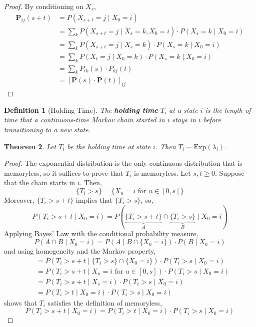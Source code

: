\documentclass{tufte-handout}
\newtheorem{thm}{Theorem}
\newtheorem{defn}[thm]{Definition}
\begin{document}
\begin{proof}
  By conditioning on $X_s$, 
  \begin{align*}
    \boldsymbol{P}_{i j}(s+t) &=P\left(X_{s+t}=j \mid X_{0}=i\right) \\
    &=\sum_{k} P\left(X_{s+t}=j \mid X_{s}=k, X_{0}=i\right) \cdot P\left(X_{s}=k \mid X_{0}=i\right) \\
    &=\sum_{k} P\left(X_{s+t}=j \mid X_{s}=k\right) \cdot P\left(X_{s}=k \mid X_{0}=i\right) \\
    &=\sum_{k} P\left(X_{t}=j \mid X_{0}=k\right) \cdot P\left(X_{s}=k \mid X_{0}=i\right) \\
    &=\sum_{k} P_{i k}(s) \cdot P_{k j}(t) \\
    &=[\mathbf{P}(s) \cdot \mathbf{P}(t)]_{i j}
    \end{align*}
\end{proof}

\begin{defn}[Holding Time]
  The \textbf{holding time} $T_i$ at a state $i$ is the length of time that a continuous-time Markov chain started in $i$ stays in $i$ before transitioning to a new state.
\end{defn}

\begin{thm}
  Let $T_i$ be the holding time at state $i$. Then $T_i \sim \text{Exp}(\lambda_i)$.
\end{thm}

\begin{proof}
  The exponential distribution is the only continuous distribution that is memoryless, so it suffices to prove that $T_i$ is memoryless. Let $s, t \geq 0$. Suppose that the chain starts in $i$. Then,
  \[\{T_i > s\} = \{X_u = i \text{ for } u \in [0,s]\}\]
  \noindent Moreover, $\{T_i > s + t\}$ implies that $\{T_i > s\}$, so,
  \[P(T_i > s + t \mid X_0 = i) = P(\underbrace{\{T_i > s + t\}}_{A} \cap \underbrace{\{T_i > s\}}_{B} \mid X_0 = i)\]
  \noindent Applying Bayes' Law with the conditional probability measure,
  \[P(A \cap B \mid X_0 = i) = P(A \mid B \cap \{X_0 = i\}) \cdot P(B \mid X_0 = i)\]
  \noindent and using homogeneity and the Markov property,
  \begin{align*}
    &= P(T_i > s + t \mid \{T_i > s\} \cap \{X_0 = i\}) \cdot P(T_i > s \mid X_0 = i) \\
    &=P\left(T_{i}>s+t \mid X_{u}=i \text { for } u \in [0,s] \right) \cdot P\left(T_{i}>s \mid X_{0}=i\right) \\
    &=P\left(T_{i}>s+t \mid X_{s}=i\right) \cdot P\left(T_{i}>s \mid X_{0}=i\right) \\
    &=P\left(T_{i}>t \mid X_{0}=i\right) \cdot P\left(T_{i}>s \mid X_{0}=i\right)
  \end{align*}
  \noindent shows that $T_i$ satisfies the definition of memoryless,
  \[P(T_i > s + t \mid X_0 = i) = P\left(T_{i}>t \mid X_{0}=i\right) \cdot P\left(T_{i}>s \mid X_{0}=i\right)\]
\end{proof}
\end{document}
